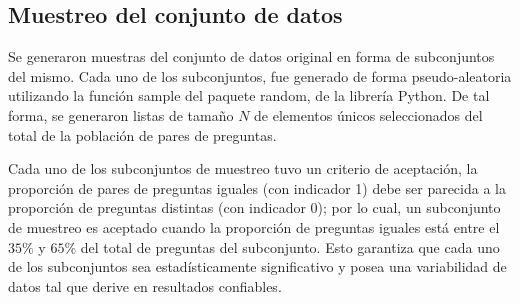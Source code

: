 \subsection{Muestreo del conjunto de datos}

Se generaron muestras del conjunto de datos original en forma de subconjuntos del mismo. Cada uno de los subconjuntos, fue generado de forma pseudo-aleatoria utilizando la función sample del paquete random, de la librería Python. De tal forma, se generaron listas de tamaño \(N\) de elementos únicos seleccionados del total de la población de pares de preguntas.

\bigskip Cada uno de los subconjuntos de muestreo tuvo un criterio de aceptación, la proporción de pares de preguntas iguales (con indicador 1) debe ser parecida a la proporción de preguntas distintas (con indicador 0); por lo cual, un subconjunto de muestreo es aceptado cuando la proporción de preguntas iguales está entre el \(35\%\) y \(65\%\) del total de preguntas del subconjunto. Esto garantiza que cada uno de los subconjuntos sea estadísticamente significativo y posea una variabilidad de datos tal que derive en resultados confiables.

